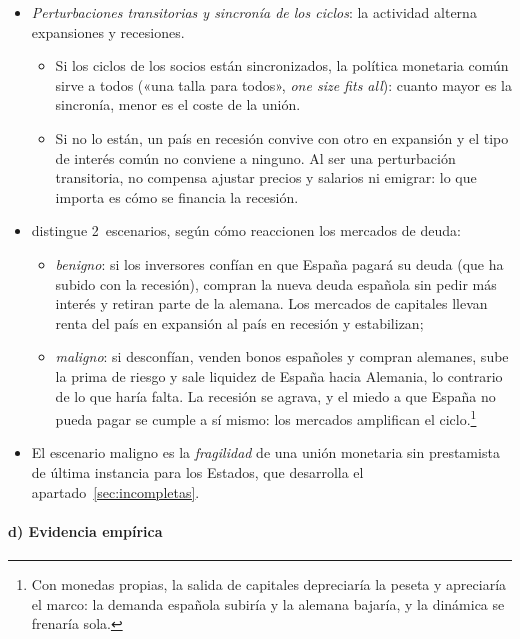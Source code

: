 \documentclass[11pt]{article}
\begin{document}
\begin{itemize}
\item \emph{Perturbaciones transitorias y sincronía de los ciclos}: la actividad alterna expansiones y recesiones.
  \begin{itemize}
  \item Si los ciclos de los socios están sincronizados, la política monetaria común sirve a todos («una talla para todos», \emph{one size fits all}): cuanto mayor es la sincronía, menor es el coste de la unión.
  \item Si no lo están, un país en recesión convive con otro en expansión y el tipo de interés común no conviene a ninguno. Al ser una perturbación transitoria, no compensa ajustar precios y salarios ni emigrar: lo que importa es cómo se financia la recesión.
  \end{itemize}
\item \textcite{DeGrauwe2022Economics} distingue 2~escenarios, según cómo reaccionen los mercados de deuda:
  \begin{itemize}
  \item \emph{benigno}: si los inversores confían en que España pagará su deuda (que ha subido con la recesión), compran la nueva deuda española sin pedir más interés y retiran parte de la alemana. Los mercados de capitales llevan renta del país en expansión al país en recesión y estabilizan;
  \item \emph{maligno}: si desconfían, venden bonos españoles y compran alemanes, sube la prima de riesgo y sale liquidez de España hacia Alemania, lo contrario de lo que haría falta. La recesión se agrava, y el miedo a que España no pueda pagar se cumple a sí mismo: los mercados amplifican el ciclo.\footnote{Con monedas propias, la salida de capitales depreciaría la peseta y apreciaría el marco: la demanda española subiría y la alemana bajaría, y la dinámica se frenaría sola.}
  \end{itemize}
\item El escenario maligno es la \emph{fragilidad} de una unión monetaria sin prestamista de última instancia para los Estados, que desarrolla el apartado~\ref{sec:incompletas}.
\end{itemize}

\paragraph{d) Evidencia empírica}
\end{document}
